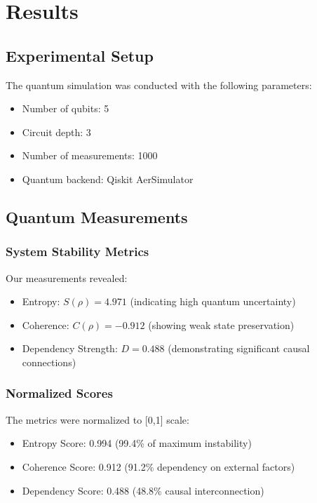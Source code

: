 \section{Results}\label{sec:results}

\subsection{Experimental Setup}
The quantum simulation was conducted with the following parameters:
\begin{itemize}
    \item Number of qubits: 5
    \item Circuit depth: 3
    \item Number of measurements: 1000
    \item Quantum backend: Qiskit AerSimulator
\end{itemize}

\subsection{Quantum Measurements}

\subsubsection{System Stability Metrics}
Our measurements revealed:
\begin{itemize}
    \item Entropy: $S(\rho) = 4.971$ (indicating high quantum uncertainty)
    \item Coherence: $C(\rho) = -0.912$ (showing weak state preservation)
    \item Dependency Strength: $D = 0.488$ (demonstrating significant causal connections)
\end{itemize}

\subsubsection{Normalized Scores}
The metrics were normalized to [0,1] scale:
\begin{itemize}
    \item Entropy Score: 0.994 (99.4\% of maximum instability)
    \item Coherence Score: 0.912 (91.2\% dependency on external factors)
    \item Dependency Score: 0.488 (48.8\% causal interconnection)
\end{itemize}